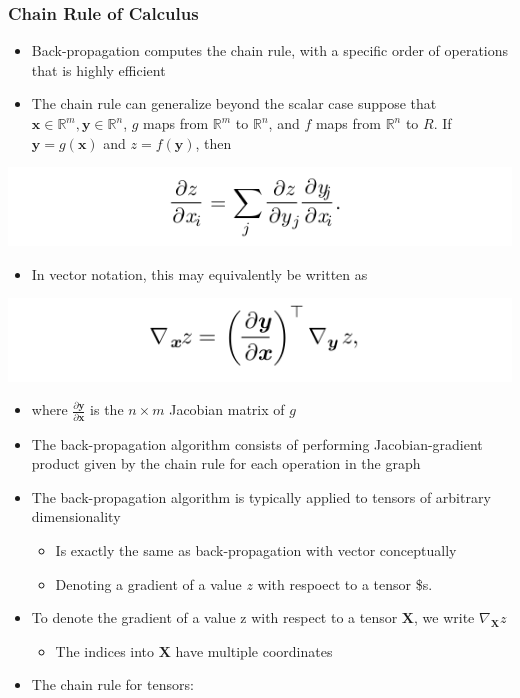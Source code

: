 \documentclass[11pt]{article}
\begin{document}
\subsubsection{Chain Rule of Calculus}
\label{sec:org234078f}
\begin{itemize}
\item Back-propagation computes the chain rule, with a specific order of operations that is highly efficient
\item The chain rule can generalize beyond the scalar case suppose that \(\pmb x \in \mathbb R^m, \pmb y \in \mathbb R^n\), \(g\) maps from \(\mathbb R^m\) to \(\mathbb R^n\), and \(f\) maps from \(\mathbb R^n\) to \(R\). If \(\pmb y = g(\pmb x)\) and \(z = f(\pmb y)\), then
\end{itemize}
\begin{center}
\includegraphics[width=.9\linewidth]{Deep Feedforward Networks/screenshot_2018-10-01_17-55-43.png}
\end{center}
\begin{itemize}
\item In vector notation, this may equivalently be written as
\end{itemize}
\begin{center}
\includegraphics[width=.9\linewidth]{Deep Feedforward Networks/screenshot_2018-10-01_17-56-15.png}
\end{center}
\begin{itemize}
\item where \(\frac{\partial \pmb y}{\partial \pmb x}\)  is the \(n \times m\) Jacobian matrix of \(g\)

\item The back-propagation algorithm consists of performing Jacobian-gradient product given by the chain rule for each operation in the graph
\item The back-propagation algorithm is typically applied to tensors of arbitrary dimensionality
\begin{itemize}
\item Is exactly the same as back-propagation with vector conceptually
\item Denoting a gradient of a value \(z\) with respoect to a tensor \$s.
\end{itemize}
\item To denote the gradient of a value z with respect to a tensor \(\pmb X\), we write \(\nabla_{\pmb X} z\)
\begin{itemize}
\item The indices into \(\pmb X\) have multiple coordinates
\end{itemize}

\item The chain rule for tensors:
\end{itemize}
\end{document}
